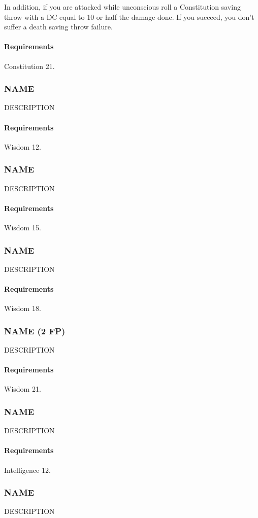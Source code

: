     In addition, if you are attacked while unconscious roll a Constitution saving throw with a DC equal to 10 or half the damage done.
    If you succeed, you don't suffer a death saving throw failure.
    \paragraph{Requirements} Constitution 21.
\subsubsection{NAME} \label{feat::name}
    DESCRIPTION
    \paragraph{Requirements} Wisdom 12.
\subsubsection{NAME} \label{feat::name}
    DESCRIPTION
    \paragraph{Requirements} Wisdom 15.
\subsubsection{NAME} \label{feat::name}
    DESCRIPTION
    \paragraph{Requirements} Wisdom 18.
\subsubsection{NAME (2 FP)} \label{feat::name}
    DESCRIPTION
    \paragraph{Requirements} Wisdom 21.
\subsubsection{NAME} \label{feat::name}
    DESCRIPTION
    \paragraph{Requirements} Intelligence 12.
\subsubsection{NAME} \label{feat::name}
    DESCRIPTION
